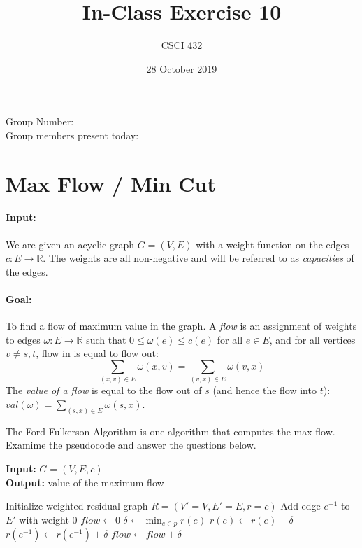 \documentclass{article}
\title{In-Class Exercise 10}
\author{CSCI 432}
\date{28 October 2019}
\def\R{{\mathbb R}}
\begin{document}
\maketitle

\noindent
Group Number:\\
Group members present today:

\section*{Max Flow / Min Cut}

\paragraph{Input:} We are given an acyclic graph $G=(V,E)$ with a weight function on the
edges $c \colon E \to \R$.  The weights are all non-negative and will be
referred to as \emph{capacities} of the edges.

\paragraph{Goal:} To find a flow of maximum value in the graph.  A \emph{flow}
is an assignment of weights to edges $\omega \colon E \to \R$ such that $0 \leq
\omega(e) \leq c(e)$ for all $e \in E$, and for all vertices $v \neq s,t$, flow
in is equal to flow out:
$$ \sum_{(x,v) \in E} \omega(x,v) = \sum_{(v,x) \in E} \omega(v,x) $$
The \emph{value of a flow} is equal to the flow out of
$s$ (and hence the flow into $t$): $val(\omega) = \sum_{(s,x) \in E}
\omega(s,x).$

The Ford-Fulkerson Algorithm is one algorithm that computes the max flow.
Examime the pseudocode and answer the questions below.

\begin{algorithm}
{\bf Input:} $G=(V,E,c)$\\
{\bf Output:} value of the maximum flow
\begin{algorithmic}[1]
\State Initialize weighted residual graph $R=(V'=V,E'=E,r=c)$
\State Add edge $e^{-1}$ to $E'$ with weight $0$
\EndFor
\State $flow \gets 0$
\State $\delta \gets \min_{e \in p} r(e)$
\State $r(e) \gets r(e) - \delta$
\State $r(e^{-1}) \gets r(e^{-1}) + \delta$
\EndFor
\State $flow \gets flow + \delta$
\EndWhile
\end{algorithmic}
\end{algorithm}
\end{document}

